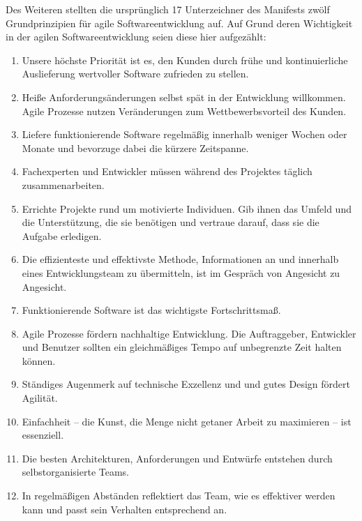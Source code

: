Des Weiteren stellten die ursprünglich 17 Unterzeichner des Manifests zwölf Grundprinzipien für agile Softwareentwicklung auf. \cite{bib:eckstein} Auf Grund deren Wichtigkeit in der agilen Softwareentwicklung seien diese hier aufgezählt:
\begin{enumerate}
	\item Unsere höchste Priorität ist es, den Kunden durch frühe und kontinuierliche Auslieferung wertvoller Software zufrieden zu stellen.
	\item Heiße Anforderungsänderungen selbst spät in der Entwicklung willkommen. Agile Prozesse nutzen Veränderungen zum Wettbewerbsvorteil des Kunden.
	\item Liefere funktionierende Software regelmäßig innerhalb weniger Wochen oder Monate und bevorzuge dabei die kürzere Zeitspanne.
	\item Fachexperten und Entwickler müssen während des Projektes täglich zusammenarbeiten.
	\item Errichte Projekte rund um motivierte Individuen. Gib ihnen das Umfeld und die Unterstützung, die sie benötigen und vertraue darauf, dass sie die Aufgabe erledigen.
	\item Die effizienteste und effektivste Methode, Informationen an und innerhalb eines Entwicklungsteam zu übermitteln, ist im Gespräch von Angesicht zu Angesicht.
	\item Funktionierende Software ist das wichtigste Fortschrittsmaß.
	\item Agile Prozesse fördern nachhaltige Entwicklung. Die Auftraggeber, Entwickler und Benutzer sollten ein gleichmäßiges Tempo auf unbegrenzte Zeit halten können.
	\item Ständiges Augenmerk auf technische Exzellenz und und gutes Design fördert Agilität.
	\item Einfachheit -- die Kunst, die Menge nicht getaner Arbeit zu maximieren -- ist essenziell.
	\item Die besten Architekturen, Anforderungen und Entwürfe entstehen durch selbstorganisierte Teams.
	\item In regelmäßigen Abständen reflektiert das Team, wie es effektiver werden kann und passt sein Verhalten entsprechend an.
\end{enumerate}